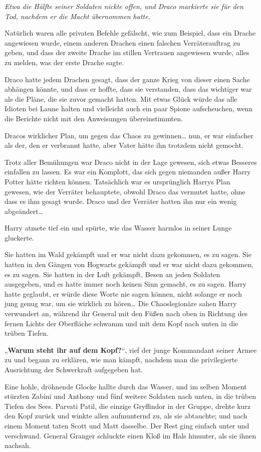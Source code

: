 {\emph{Etwa die Hälfte seiner Soldaten nickte offen, und Draco markierte sie für den Tod, nachdem er die Macht übernommen hatte.}

Natürlich waren alle privaten Befehle gefälscht, wie zum Beispiel, dass ein Drache angewiesen wurde, einem anderen Drachen einen falschen Verräterauftrag zu geben, und dass der zweite Drache im stillen Vertrauen angewiesen wurde, alles zu melden, was der erste Drache sagte.

Draco hatte jedem Drachen gesagt, dass der ganze Krieg von dieser einen Sache abhängen könnte, und dass er hoffte, dass sie verstanden, dass das wichtiger war als die Pläne, die sie zuvor gemacht hatten. Mit etwas Glück würde das alle Idioten bei Laune halten und vielleicht auch ein paar Spione aufscheuchen, wenn die Berichte nicht mit den Anweisungen übereinstimmten.

Dracos wirklicher Plan, um gegen das Chaos zu gewinnen… nun, er war einfacher als der, den er verbrannt hatte, aber Vater hätte ihn trotzdem nicht gemocht.

Trotz aller Bemühungen war Draco nicht in der Lage gewesen, sich etwas Besseres einfallen zu lassen. Es war ein Komplott, das sich gegen niemanden außer Harry Potter hätte richten können. Tatsächlich war es ursprünglich Harrys Plan gewesen, wie der Verräter behauptete, obwohl Draco das vermutet hatte, ohne dass es ihm gesagt wurde. Draco und der Verräter hatten ihn nur ein wenig abgeändert…

Harry atmete tief ein und spürte, wie das Wasser harmlos in seiner Lunge gluckerte.

Sie hatten im Wald gekämpft und er war nicht dazu gekommen, es zu sagen. Sie hatten in den Gängen von Hogwarts gekämpft und er war nicht dazu gekommen, es zu sagen. Sie hatten in der Luft gekämpft, Besen an jeden Soldaten ausgegeben, und es hatte immer noch keinen Sinn gemacht, es zu sagen. Harry hatte geglaubt, er würde diese Worte nie sagen können, nicht solange er noch jung genug war, um sie wirklich zu hören… Die Chaoslegionäre sahen Harry verwundert an, während ihr General mit den Füßen nach oben in Richtung des fernen Lichts der Oberfläche schwamm und mit dem Kopf nach unten in die trüben Tiefen.

„\textbf{Warum steht ihr auf dem Kopf?}“, rief der junge Kommandant seiner Armee zu und begann zu erklären, wie man kämpft, nachdem man die privilegierte Ausrichtung der Schwerkraft aufgegeben hat.

Eine hohle, dröhnende Glocke hallte durch das Wasser, und im selben Moment stürzten Zabini und Anthony und fünf weitere Soldaten nach unten, in die trüben Tiefen des Sees. Parvati Patil, die einzige Gryffindor in der Gruppe, drehte kurz den Kopf zurück und winkte allen aufmunternd zu, als sie abtauchte; und nach einem Moment taten Scott und Matt dasselbe. Der Rest ging einfach unter und verschwand. General Granger schluckte einen Kloß im Hals hinunter, als sie ihnen nachsah.

}
